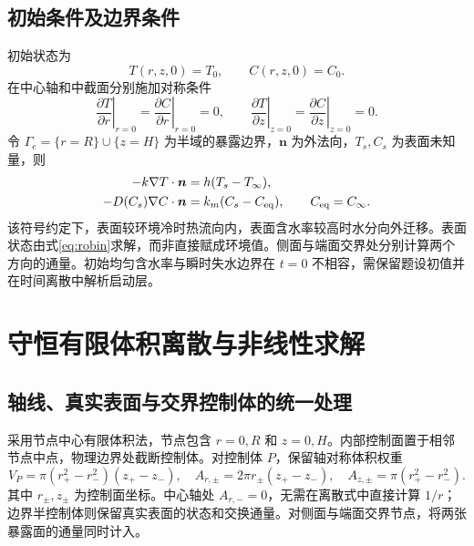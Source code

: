 \subsection{初始条件及边界条件}
初始状态为
\begin{equation}
 T(r,z,0)=T_0,\qquad C(r,z,0)=C_0.
 \label{eq:initial}
\end{equation}
在中心轴和中截面分别施加对称条件
\begin{equation}
 \left.\frac{\partial T}{\partial r}\right|_{r=0}
 =\left.\frac{\partial C}{\partial r}\right|_{r=0}=0,\qquad
 \left.\frac{\partial T}{\partial z}\right|_{z=0}
 =\left.\frac{\partial C}{\partial z}\right|_{z=0}=0.
 \label{eq:symmetry}
\end{equation}
令 $\Gamma_e=\{r=R\}\cup\{z=H\}$ 为半域的暴露边界，$\bm n$ 为外法向，$T_s,C_s$ 为表面未知量，则
\begin{equation}
 \begin{aligned}
 -k\nabla T\cdot\bm n&=h(T_s-T_{\infty}),\\
 -D(C_s)\nabla C\cdot\bm n&=k_m(C_s-C_{\mathrm{eq}}),\qquad C_{\mathrm{eq}}=C_\infty.
 \end{aligned}
 \label{eq:robin}
\end{equation}
该符号约定下，表面较环境冷时热流向内，表面含水率较高时水分向外迁移。表面状态由式\eqref{eq:robin}求解，而非直接赋成环境值。侧面与端面交界处分别计算两个方向的通量。初始均匀含水率与瞬时失水边界在 $t=0$ 不相容，需保留题设初值并在时间离散中解析启动层。

\clearpage
\section{守恒有限体积离散与非线性求解}

\subsection{轴线、真实表面与交界控制体的统一处理}
采用节点中心有限体积法，节点包含 $r=0,R$ 和 $z=0,H$。内部控制面置于相邻节点中点，物理边界处截断控制体。对控制体 $P$，保留轴对称体积权重
\begin{equation}
 V_P=\pi(r_+^2-r_-^2)(z_+-z_-),\quad
 A_{r,\pm}=2\pi r_\pm(z_+-z_-),\quad
 A_{z,\pm}=\pi(r_+^2-r_-^2).
 \label{eq:volume}
\end{equation}
其中 $r_\pm,z_\pm$ 为控制面坐标。中心轴处 $A_{r,-}=0$，无需在离散式中直接计算 $1/r$；边界半控制体则保留真实表面的状态和交换通量。对侧面与端面交界节点，将两张暴露面的通量同时计入。

